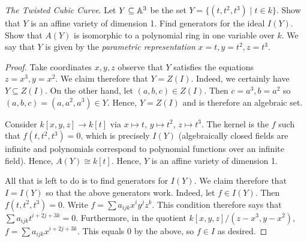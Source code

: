 \label{1.1.2}

\textit{The Twisted Cubic Curve}. Let $Y \subseteq \mathbb A^3$ be the set $Y = \{(t, t^2, t^3) \mid t \in k\}$. Show that $Y$ is an affine variety of dimension 1. Find generators for the ideal $I(Y)$. Show that $A(Y)$ is isomorphic to a polynomial ring in one variable over $k$. We say that $Y$ is given by the \textit{parametric representation} $x = t, y = t^2, z = t^3$.

\begin{proof}
    Take coordinates $x, y, z$ observe that $Y$ satisfies the equations $z = x^3, y = x^2$. We claim therefore that $Y = Z(I)$. Indeed, we certainly have $Y \subseteq Z(I)$. On the other hand, let $(a, b, c) \in Z(I)$. Then $c = a^3, b = a^2$ so $(a, b, c) = (a, a^2, a^3) \in Y$. Hence, $Y = Z(I)$ and is therefore an algebraic set.
    
    Consider $k[x, y, z] \longrightarrow k[t]$ via $x \mapsto t$, $y \mapsto t^2$, $z \mapsto t^3$. The kernel is the $f$ such that $f(t, t^2, t^3) = 0$, which is precisely $I(Y)$ (algebraically closed fields are infinite and polynomials correspond to polynomial functions over an infinite field). Hence, $A(Y) \cong k[t]$. Hence, $Y$ is an affine variety of dimension 1.
    
    All that is left to do is to find generators for $I(Y)$. We claim therefore that $I = I(Y)$ so that the above generators work. Indeed, let $f \in I(Y)$. Then $f(t, t^2, t^3) = 0$. Write $f = \sum a_{ijk} x^i y^j z^k$. This condition therefore says that $\sum a_{ijk} t^{i + 2j + 3k} = 0$. Furthermore, in the quotient $k[x, y, z]/(z - x^3, y - x^2)$, $f = \sum a_{ijk} x^{i + 2j + 3k}$. This equals $0$ by the above, so $f \in I$ as desired.
\end{proof}
